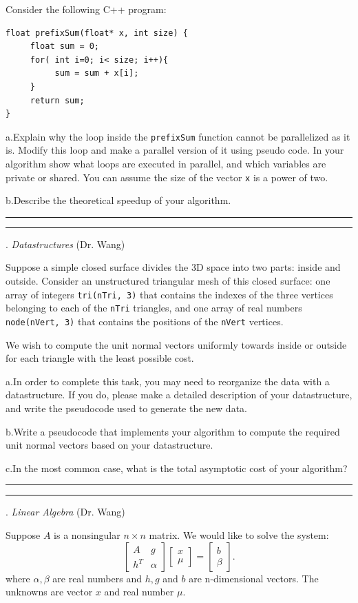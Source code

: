 \documentclass [11point]{article}
\begin{document}
Consider the following C++ program:

\begin{verbatim}
float prefixSum(float* x, int size) {
     float sum = 0;
     for( int i=0; i< size; i++){
          sum = sum + x[i];
     }
     return sum;
}
\end{verbatim}

\medskip

a.\quad Explain why the loop inside the \texttt{prefixSum} function cannot be parallelized as it is. Modify this loop and make a parallel version of it using pseudo code. In your algorithm show what loops are executed in parallel, and which variables are private or shared. You can assume the size of the vector \texttt{x} is a power of two.\medskip

b.\quad Describe the theoretical speedup of your algorithm. \medskip

\bigskip 
\hrule 

\pagebreak
\hrule 
{}. \textit{Datastructures} (Dr. Wang)
\bigskip

Suppose a simple closed surface divides the 3D space into two parts: inside and outside. Consider an unstructured triangular mesh of this closed surface: one array of integers \texttt{tri(nTri, 3)} that contains the indexes of the three vertices belonging to each of the \texttt{nTri} triangles, and one array of real numbers \texttt{node(nVert, 3)} that contains the positions of the \texttt{nVert} vertices.\medskip

We wish to compute the unit normal vectors uniformly towards inside or outside for each triangle with the least possible cost.\medskip

a.\quad In order to complete this task, you may need to reorganize the data with a datastructure. If you do, please make a detailed
description of your datastructure, and write the pseudocode used to generate the new data.\medskip

b.\quad Write a pseudocode that implements your algorithm to compute the required unit normal vectors based on your datastructure.\medskip

c.\quad In the most common case, what is the total asymptotic cost of your algorithm?


\bigskip
\hrule 


\pagebreak
\hrule 
{}. \textit{Linear Algebra} (Dr. Wang)
\bigskip

Suppose $A$ is a nonsingular $n \times n$ matrix. We would like to solve the system:
$$
\left[
\begin{array}{rr}
A & g \\
h^T & \alpha
\end{array} \right]
\left[
\begin{array}{r}
x \\
\mu
\end{array} \right]=
\left[
\begin{array}{rr}
b \\
\beta
\end{array} \right].
$$
where $\alpha, \beta$ are real numbers and $h, g$ and $b$ are
n-dimensional vectors. The unknowns are vector $x$ and real number
$\mu$.\medskip
\end{document}
